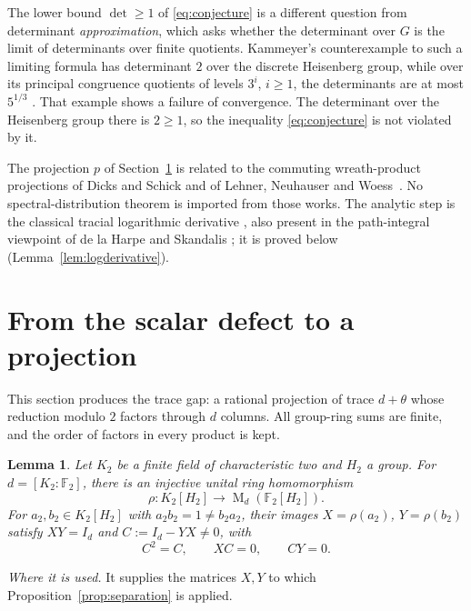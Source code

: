 \documentclass[11pt]{article}
\newtheorem{lemma}[theorem]{Lemma}
\theoremstyle{remark}
\numberwithin{equation}{section}
\newcommand{\F}{\mathbb F}
\newcommand{\Mat}{\operatorname{M}}
\begin{document}
The lower bound $\det\ge1$ of \eqref{eq:conjecture} is a different question from determinant \emph{approximation}, which asks whether the determinant over $G$ is the limit of determinants over finite quotients. Kammeyer's counterexample to such a limiting formula has determinant $2$ over the discrete Heisenberg group, while over its principal congruence quotients of levels $3^i$, $i\ge1$, the determinants are at most $5^{1/3}$ \cite[Theorem 2 and Section 2]{Kammeyer2026}. That example shows a failure of convergence. The determinant over the Heisenberg group there is $2\ge1$, so the inequality \eqref{eq:conjecture} is not violated by it.

The projection $p$ of Section~\ref{sec:projection} is related to the commuting wreath-product projections of Dicks and Schick \cite[Section 3]{DicksSchick2002} and of Lehner, Neuhauser and Woess~\cite[Section 2]{LehnerNeuhauserWoess2008}. No spectral-distribution theorem is imported from those works. The analytic step is the classical tracial logarithmic derivative \cite[Lemma 2]{FK1952}, also present in the path-integral viewpoint of de la Harpe and Skandalis \cite[Lemma 1 and Proposition 2(d)]{deLaHarpeSkandalis1984}; it is proved below (Lemma~\ref{lem:logderivative}).

\section{From the scalar defect to a projection}
\label{sec:projection}

This section produces the trace gap: a rational projection of trace $d+\theta$ whose reduction modulo $2$ factors through $d$ columns. All group-ring sums are finite, and the order of factors in every product is kept.

\begin{lemma}\label{lem:binary}
Let $K_2$ be a finite field of characteristic two and $H_2$ a group.
For $d=[K_2:\F_2]$, there is an injective unital ring homomorphism
\[
 \rho:K_2[H_2]\longrightarrow\Mat_d(\F_2[H_2]).
\]
For $a_2,b_2\in K_2[H_2]$ with $a_2b_2=1\ne b_2a_2$, their images $X=\rho(a_2)$, $Y=\rho(b_2)$ satisfy
$XY=I_d$ and $C:=I_d-YX\ne0$, with
\begin{equation}\label{eq:defect}
 C^2=C,\qquad XC=0,\qquad CY=0.
\end{equation}
\end{lemma}

\noindent\emph{Where it is used.} It supplies the matrices $X,Y$ to which Proposition~\ref{prop:separation} is applied.
\end{document}
